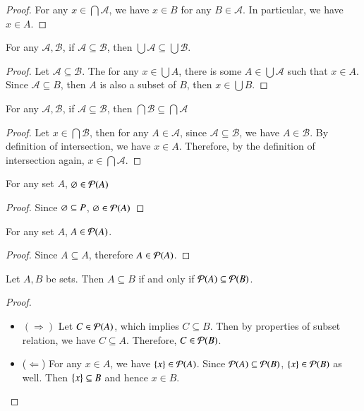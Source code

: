 \begin{proof}
    For any $x\in \bigcap\mathscr A$, we have $x\in B$ for any $B\in\mathscr A$. In particular, we have $x\in A$. 
\end{proof}
\begin{prop}
    For any $\mathscr A, \mathscr B$, if $\mathscr A\subseteq \mathscr B$, then $\bigcup\mathscr A\subseteq \bigcup\mathscr B$.
\end{prop}
\begin{proof}
    Let $\mathscr A\subseteq \mathscr B$. The for any $x\in \bigcup A$, there is some $A\in\bigcup \mathscr A$ such that $x\in A$. Since $\mathscr A\subseteq B$, then $A$ is also a subset of $B$, then $x\in \bigcup B$.
\end{proof}
\begin{prop}
    For any $\mathscr A, \mathscr B$, if $\mathscr A\subseteq \mathscr B$, then $\bigcap \mathscr B\subseteq \bigcap\mathscr A$
\end{prop}
\begin{proof}
    Let $x\in\bigcap\mathscr B$, then for any $A\in\mathscr A$, since $\mathscr A\subseteq \mathscr B$, we have $A\in\mathscr B$. By definition of intersection, we have $x\in A$. Therefore, by the definition of intersection again, $x\in \bigcap\mathscr A$.
\end{proof}
\begin{prop}
    For any set $A$, $\varnothing\in\mathcal{P}(A)$
\end{prop}
\begin{proof}
    Since $\varnothing\subseteq P$, $\varnothing\in \mathcal{P}(A)$
\end{proof}
\begin{prop}
    For any set $A$, $A\in\mathcal{P}(A)$.
\end{prop}
\begin{proof}
    Since $A\subseteq A$, therefore $A\in\mathcal{P}(A)$.
\end{proof}
\begin{prop}
    Let $A,B$ be sets. Then $A\subseteq B$ if and only if $\mathcal{P}(A)\subseteq \mathcal{P}(B)$.
\end{prop}
\begin{proof}
    ~
    \begin{itemize}
        \item $(\Rightarrow)$ Let $C\in\mathcal{P}(A)$, which implies $C\subseteq B$. Then by properties of subset relation, we have $C\subseteq A$. Therefore, $C\in \mathcal{P}(B)$.
        \item ($\Leftarrow$) For any $x\in A$, we have $\{x\}\in\mathcal{P}(A)$. Since $\mathcal{P}(A)\subseteq \mathcal{P}(B)$, $\{x\}\in\mathcal{P}(B)$ as well. Then $\{x\}\subseteq B$ and hence $x\in B$.
    \end{itemize}
\end{proof}
